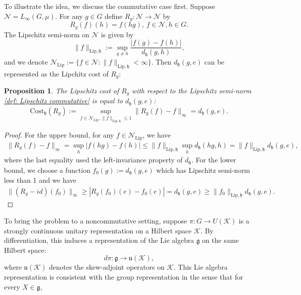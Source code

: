 \documentclass[11pt,reqno]{amsart}
\numberwithin{equation}{section}
\newtheorem{prop}[lemma]{Proposition}
\newcommand{\mc}{\mathcal}
\newcommand{\Lip}{\mathrm{Lip}}
\newcommand{\Cost}{\mathrm{Cost}}
\begin{document}
To illustrate the idea, we discuss the commutative case first. Suppose $\mc N = L_{\infty}(G,\mu)$. For any $g\in G$ define $R_g: \mc N \to \mc N$ by
\begin{equation}
R_g(f)(h) = f(hg),\ f\in \mc N, h\in G.
\end{equation}
The Lipschitz semi-norm on $\mc N$ is given by 
\begin{equation}\label{def: Lipschitz commutative}
\|f\|_{\Lip,\mathfrak{h}}:= \sup_{g\neq h} \frac{|f(g) - f(h)|}{d_\mathfrak{h}(g,h)},
\end{equation}
and we denote $\mc N_{\Lip}:= \{f \in \mc N: \|f\|_{\Lip,\mathfrak{h}} < \infty\}$. Then $d_\mathfrak{h}(g,e)$ can be represented as the Lipchitz cost of $R_g$:
\begin{prop}\label{equality: commutative}
The Lipschitz cost of $R_g$ with respect to the Lipschitz semi-norm \eqref{def: Lipschitz commutative} is equal to $d_\mathfrak{h}(g,e)$:
\begin{equation}
   \Cost_\mathfrak{h}(R_g):= \sup_{f \in \mc N_{\Lip}, \|f\|_{\Lip,\mathfrak{h}} \le 1} \|R_g(f) - f\|_{\infty} = d_\mathfrak{h}(g,e).
\end{equation}
\end{prop}
\begin{proof}
For the upper bound, for any $f\in \mc N_{\Lip}$, we have 
\begin{align*}
\|R_g(f) - f\|_{\infty} = \sup_h |f(hg) - f(h)| \le \|f\|_{\Lip,\mathfrak{h}} \sup_h d_\mathfrak{h}(hg,h) = \|f\|_{\Lip,\mathfrak{h}} d_\mathfrak{h}(g,e),
\end{align*}
where the last equality used the left-invariance property of $d_\mathfrak{h}$. For the lower bound, we choose a function $f_0(g):= d_\mathfrak{h}(g,e)$ which has Lipschitz semi-norm less than 1 and we have 
\begin{align*}
\|(R_g- id)(f_0)\|_{\infty} \ge |R_g(f_0)(e) -f_0(e)| = d_\mathfrak{h}(g,e) \ge \|f_0\|_{\Lip,\mathfrak{h}} d_\mathfrak{h}(g,e).
\end{align*}
\end{proof}
To bring the problem to a noncommutative setting, suppose $\pi: G \to U(\mathcal{K})$ is a strongly continuous unitary representation on a Hilbert space $\mathcal{K}$. By differentiation, this induces a representation of the Lie algebra $\mathfrak{g}$ on the same Hilbert space:
$$
d\pi : \mathfrak{g} \to \mathfrak{u}(\mathcal{K}),
$$
where $\mathfrak{u}(\mathcal{K})$ denotes the skew-adjoint operators on $\mathcal{K}$. This Lie algebra representation is consistent with the group representation in the sense that for every $X \in \mathfrak{g}$,
\end{document}
